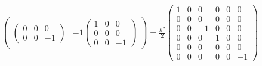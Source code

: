\documentclass[a4paper,german,12pt,smallheadings]{scrartcl}
\begin{document}
\begin{enumerate}[a)]
\begin{align*}
\begin{pmatrix}
\begin{pmatrix}
              0 & 0 & 0 \\
              0 & 0 & -1
            \end{pmatrix}
           &
          -1
            \begin{pmatrix}
              1 & 0 & 0 \\
              0 & 0 & 0 \\
              0 & 0 & -1
            \end{pmatrix}
          \end{pmatrix}
          =
          \frac{\hbar^2}{2}
          \begin{pmatrix}
            1 & 0 & 0 & 0 & 0 & 0 \\
            0 & 0 & 0 & 0 & 0 & 0 \\
            0 & 0 & -1 & 0 & 0 & 0 \\
            0 & 0 & 0 & 1 & 0 & 0 \\
            0 & 0 & 0 & 0 & 0 & 0 \\
            0 & 0 & 0 & 0 & 0 & -1
          \end{pmatrix}
    \end{align*}



\end{enumerate}
\end{document}
